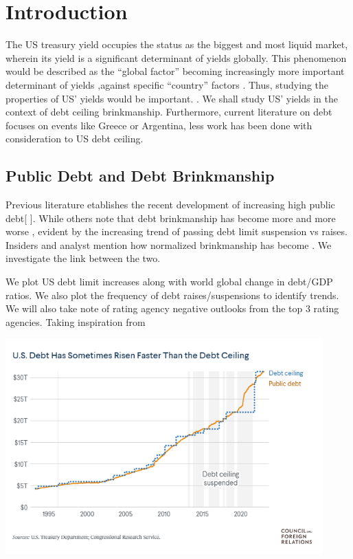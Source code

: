 \documentclass[
  12pt]{article}
\begin{document}
\hypertarget{introduction}{%
\section{Introduction}\label{introduction}}

The US treasury yield occupies the status as the biggest and most liquid
market, wherein its yield is a significant determinant of yields
globally. This phenomenon would be described as the ``global factor''
becoming increasingly more important determinant of yields ,against
specific ``country'' factors \citep{mauro2002}. Thus, studying the
properties of US' yields would be important.
\citep{rozada2006, gonzález-rozada2008, longstaff2011}. We shall study
US' yields in the context of debt ceiling brinkmanship. Furthermore,
current literature on debt focuses on events like Greece or Argentina,
less work has been done with consideration to US debt ceiling.

\hypertarget{public-debt-and-debt-brinkmanship}{%
\subsection{Public Debt and Debt
Brinkmanship}\label{public-debt-and-debt-brinkmanship}}

Previous literature etablishes the recent development of increasing high
public debt{[} \citet{mitchener2023} {]}. While others note that debt
brinkmanship has become more and more worse \citep{berman} , evident by
the increasing trend of passing debt limit suspension vs raises.
Insiders and analyst mention how normalized brinkmanship has become
\citep{bivens} . We investigate the link between the two.

We plot US debt limit increases along with world global change in
debt/GDP ratios. We also plot the frequency of debt raises/suspensions
to identify trends. We will also take note of rating agency negative
outlooks from the top 3 rating agencies. Taking inspiration from

\includegraphics[width=4.8125in,height=\textheight]{style-guide/Debt plot.png}
\end{document}
